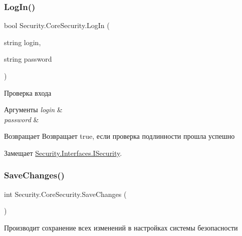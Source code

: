 \mbox{\label{class_security_1_1_core_security_a87672cfd35522b393c3139daa4960258}} 
\subsubsection{\texorpdfstring{Log\+In()}{LogIn()}}
{\footnotesize\ttfamily bool Security.\+Core\+Security.\+Log\+In (\begin{DoxyParamCaption}\item[{string}]{login,  }\item[{string}]{password }\end{DoxyParamCaption})}



Проверка входа 


\begin{DoxyParams}{Аргументы}
{\em login} & \\
\hline
{\em password} & \\
\hline
\end{DoxyParams}
\begin{DoxyReturn}{Возвращает}
Возвращает true, если проверка подлинности прошла успешно
\end{DoxyReturn}


Замещает \hyperlink{interface_security_1_1_interfaces_1_1_i_security_a85a48460a5d327c495647539670049f8}{Security.\+Interfaces.\+I\+Security}.

\mbox{\label{class_security_1_1_core_security_a85c19dc69e9698e6d6df724721ae5795}} 
\subsubsection{\texorpdfstring{Save\+Changes()}{SaveChanges()}}
{\footnotesize\ttfamily int Security.\+Core\+Security.\+Save\+Changes (\begin{DoxyParamCaption}{ }\end{DoxyParamCaption})}



Производит сохранение всех изменений в настройках системы безопасности 

